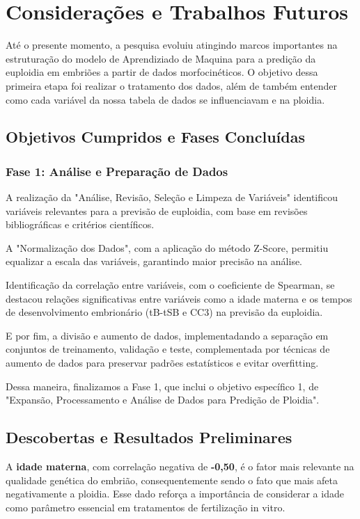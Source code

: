 \chapter[Considerações e Trabalhos Futuros]{Considerações e Trabalhos Futuros}

Até o presente momento, a pesquisa evoluiu atingindo marcos importantes na estruturação do modelo de Aprendiziado de Maquina para a predição da euploidia em embriões a partir de dados morfocinéticos. O objetivo dessa primeira etapa foi realizar o tratamento dos dados, além de também entender como cada variável da nossa tabela de dados se influenciavam e na ploidia. 

\section{Objetivos Cumpridos e Fases Concluídas}
\subsection{Fase 1: Análise e Preparação de Dados}
A realização da "Análise, Revisão, Seleção e Limpeza de Variáveis" identificou variáveis relevantes para a previsão de euploidia, com base em revisões bibliográficas e critérios científicos.

A "Normalização dos Dados", com a aplicação do método Z-Score, permitiu equalizar a escala das variáveis, garantindo maior precisão na análise.

Identificação da correlação entre variáveis, com o coeficiente de Spearman, se destacou relações significativas entre variáveis como a idade materna e os tempos de desenvolvimento embrionário (tB-tSB e CC3) na previsão da euploidia.

E por fim, a divisão e aumento de dados, implementadando a separação em conjuntos de treinamento, validação e teste, complementada por técnicas de aumento de dados para preservar padrões estatísticos e evitar overfitting.

Dessa maneira, finalizamos a Fase 1, que inclui o objetivo específico 1, de "Expansão, Processamento e Análise de Dados para Predição de Ploidia". 

\section{Descobertas e Resultados Preliminares}

A \textbf{idade materna}, com correlação negativa de \textbf{-0,50}, é o fator mais relevante na qualidade genética do embrião, consequentemente sendo o fato que mais afeta negativamente a ploidia. Esse dado reforça a importância de considerar a idade como parâmetro essencial em tratamentos de fertilização in vitro.

